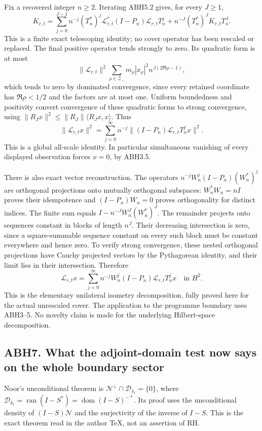 Fix a recovered integer \(n\ge2\). Iterating ABH5.2 gives, for every
\(J\ge1\), \[
K_{r,t}=
\sum_{j=0}^{J-1}n^{-j}(T_n^*)^j
\mathcal L_{r,t}^*(I-P_n)\mathcal L_{r,t}T_n^j
+n^{-J}(T_n^*)^JK_{r,t}T_n^J.
\tag{ABH6.1}
\] This is a finite exact telescoping identity; no cover operator has
been rescaled or replaced. The final positive operator tends strongly to
zero. Its quadratic form is at most \[
\|\mathcal L_{r,t}\|^2
\sum_{\rho\in\mathscr Z_-}m_\rho|x_\rho|^2n^{J(2\Re\rho-1)},
\] which tends to zero by dominated convergence, since every retained
coordinate has \(\Re\rho<1/2\) and the factors are at most one. Uniform
boundedness and positivity convert convergence of these quadratic forms
to strong convergence, using
\(\|R_Jx\|^2\le\|R_J\|\langle R_Jx,x\rangle\). Thus \[
\boxed{\|\mathcal L_{r,t}x\|^2
=\sum_{j=0}^\infty n^{-j}
\|(I-P_n)\mathcal L_{r,t}T_n^jx\|^2.}
\tag{ABH6.2}
\] This is a global all-scale identity. In particular simultaneous
vanishing of every displayed observation forces \(x=0\), by ABH3.5.

There is also exact vector reconstruction. The operators
\(n^{-j}W_n^j(I-P_n)(W_n^*)^j\) are orthogonal projections onto mutually
orthogonal subspaces: \(W_n^*W_n=nI\) proves their idempotence and
\((I-P_n)W_n=0\) proves orthogonality for distinct indices. The finite
sum equals \(I-n^{-J}W_n^J(W_n^*)^J\). The remainder projects onto
sequences constant in blocks of length \(n^J\). Their decreasing
intersection is zero, since a square-summable sequence constant on every
such block must be constant everywhere and hence zero. To verify strong
convergence, these nested orthogonal projections have Cauchy projected
vectors by the Pythagorean identity, and their limit lies in their
intersection. Therefore \[
\mathcal L_{r,t}x=
\sum_{j=0}^\infty n^{-j}W_n^j(I-P_n)\mathcal L_{r,t}T_n^jx
\quad\text{in }H^2.
\tag{ABH6.3}
\] This is the elementary unilateral isometry decomposition, fully
proved here for the actual unrescaled cover. The application to the
programme boundary uses ABH3--5. No novelty claim is made for the
underlying Hilbert-space decomposition.

\subsection{ABH7. What the adjoint-domain test now says on the whole
boundary
sector}\label{abh7.-what-the-adjoint-domain-test-now-says-on-the-whole-boundary-sector}

Noor's unconditional theorem is
\(\mathcal N^\perp\cap\mathcal D_{\delta_1}=\{0\}\), where
\(\mathcal D_{\delta_1}=\operatorname{ran}(I-S^*)=\operatorname{dom}(I-S)^{-*}\).
Its proof uses the unconditional density of \((I-S)\mathcal N\) and the
surjectivity of the inverse of \(I-S\). This is the exact theorem read
in the author TeX, not an assertion of RH.

